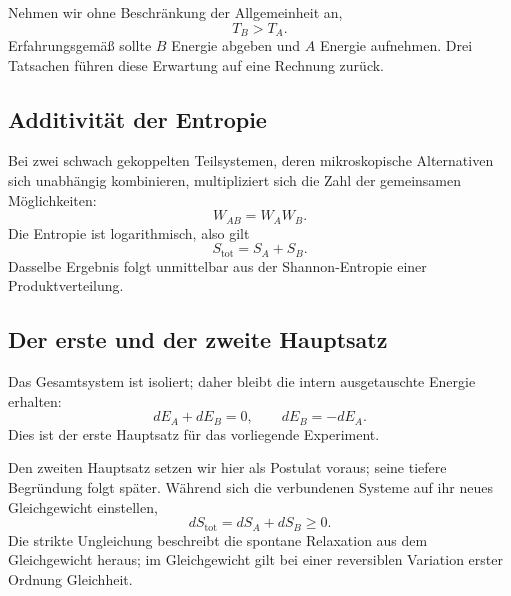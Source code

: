 Nehmen wir ohne Beschränkung der Allgemeinheit an,
\begin{equation}
 T_B>T_A.
 \label{eq:sm2-temperature-order}
\end{equation}
Erfahrungsgemäß sollte \(B\) Energie abgeben und \(A\) Energie aufnehmen. Drei Tatsachen führen diese Erwartung auf eine Rechnung zurück.

\subsection{Additivität der Entropie}

Bei zwei schwach gekoppelten Teilsystemen, deren mikroskopische Alternativen sich unabhängig kombinieren, multipliziert sich die Zahl der gemeinsamen Möglichkeiten:
\[
 W_{AB}=W_AW_B.
\]
Die Entropie ist logarithmisch, also gilt
\begin{equation}
 S_{\mathrm{tot}}=S_A+S_B.
 \label{eq:sm2-entropy-additivity}
\end{equation}
Dasselbe Ergebnis folgt unmittelbar aus der Shannon-Entropie einer Produktverteilung.

\begin{classroomqa}
\end{classroomqa}

\subsection{Der erste und der zweite Hauptsatz}

Das Gesamtsystem ist isoliert; daher bleibt die intern ausgetauschte Energie erhalten:
\begin{equation}
 dE_A+dE_B=0,
 \qquad
 dE_B=-dE_A.
 \label{eq:sm2-first-law}
\end{equation}
Dies ist der erste Hauptsatz für das vorliegende Experiment.

Den zweiten Hauptsatz setzen wir hier als Postulat voraus; seine tiefere Begründung folgt später. Während sich die verbundenen Systeme auf ihr neues Gleichgewicht einstellen,
\begin{equation}
 dS_{\mathrm{tot}}=dS_A+dS_B\geq0.
 \label{eq:sm2-second-law}
\end{equation}
Die strikte Ungleichung beschreibt die spontane Relaxation aus dem Gleichgewicht heraus; im Gleichgewicht gilt bei einer reversiblen Variation erster Ordnung Gleichheit.

